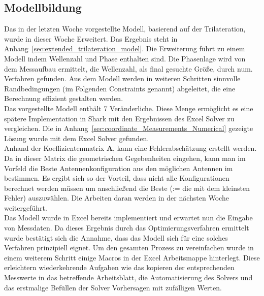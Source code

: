 \documentclass[a4paper,12pt,fleqn]{article}
\begin{document}
\subsection{Modellbildung}
Das in der letzten Woche vorgestellte Modell, basierend auf der Trilateration, wurde in dieser Woche Erweitert. Das Ergebnis steht in Anhang~\ref{sec:extended_trilateration_model}. Die Erweiterung führt zu einem Modell indem Wellenzahl und Phase enthalten sind. Die Phasenlage wird von dem Messaufbau ermittelt, die Wellenzahl, als final gesuchte Größe, durch num. Verfahren gefunden. Aus dem Modell werden in weiteren Schritten sinnvolle Randbedingungen (im Folgenden Constraints genannt) abgeleitet, die eine Berechnung effizient gestalten werden.\\
%
Das vorgestellte Modell enthält 7 Veränderliche. Diese Menge ermöglicht es eine spätere Implementation in Shark mit den Ergebnissen des Excel Solver zu vergleichen. Die in Anhang~\ref{sec:coordinate_Measurements_Numerical} gezeigte Lösung wurde mit dem Excel Solver gefunden. \\
%
Anhand der Koeffizientenmatrix \textbf{A}, kann eine Fehlerabschätzung erstellt werden. Da in dieser Matrix die geometrischen Gegebenheiten eingehen, kann man im Vorfeld die Beste Antennenkonfiguration aus den möglichen Antennen im bestimmen. Es ergibt sich so der Vorteil, dass nicht alle Konfigurationen berechnet werden müssen um anschließend die Beste (:= die mit dem kleinsten Fehler) auszuwählen. Die Arbeiten daran werden in der nächsten Woche weitergeführt.\\
%
Das Modell wurde in Excel bereits implementiert und erwartet nun die Eingabe von Messdaten. Da dieses Ergebnis durch das Optimierungsverfahren ermittelt wurde bestätigt sich die Annahme, dass das Modell sich für eine solches Verfahren prinzipiell eignet. Um den gesamten Prozess zu vereinfachen wurde in einem weiterem Schritt einige Macros in der Excel Arbeitsmappe hinterlegt. Diese erleichtern wiederkehrende Aufgaben wie das kopieren der entsprechenden Messwerte in das betreffende Arbeitsblatt, die Automatisierung des Solvers und das erstmalige Befüllen der Solver Vorhersagen mit zufälligen Werten. \\

\end{document}
